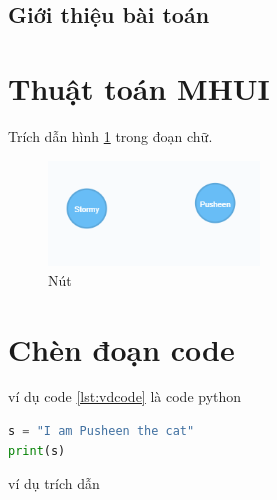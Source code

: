 \subsection{Giới thiệu bài toán}

\section{Thuật toán MHUI}




Trích dẫn hình \ref{fig:node} trong đoạn chữ. 

\begin{figure}[h]
\centering
\includegraphics[width=0.5\textwidth]{image/node.PNG}
\caption{\label{fig:node} Nút}
\end{figure}


\section{Chèn đoạn code}


ví dụ code \ref{lst:vdcode} là code python 


\begin{lstlisting}[caption={Đoạn code}, label={lst:vdcode}, language=python]
s = "I am Pusheen the cat"
print(s)
\end{lstlisting}

ví dụ trích dẫn \cite{robinson2013graph}










